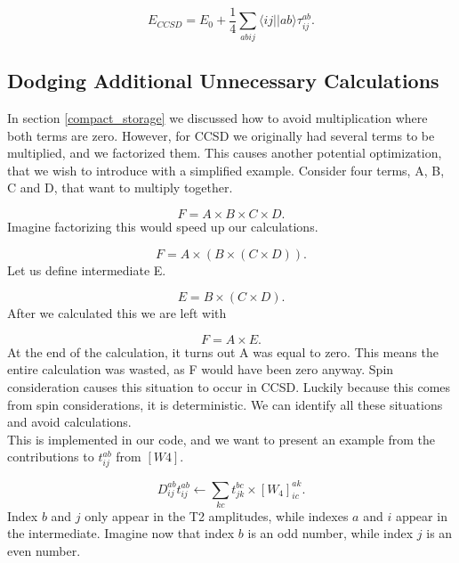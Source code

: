 \documentclass[a4paper,norsk,11pt,twoside]{report}
\begin{document}
\begin{equation}
E_{CCSD} = E_0 + \frac{1}{4} \sum_{abij} \langle ij || ab \rangle \tau_{ij}^{ab} .
\end{equation}

\subsection{Dodging Additional Unnecessary Calculations}
In section \ref{compact_storage} we discussed how to avoid multiplication where both terms are zero. However, for CCSD we originally had several terms to be multiplied, and we factorized them. This causes another potential optimization, that we wish to introduce with a simplified example. Consider four terms, A, B, C and D, that want to multiply together.

\begin{equation}
F = A \times B \times C \times D .
\end{equation}
Imagine factorizing this would speed up our calculations.

\begin{equation}
F = A \times (B \times (C \times D ) ) .
\end{equation}
Let us define intermediate E.

\begin{equation}
E = B \times (C \times D ) .
\end{equation}
After we calculated this we are left with

\begin{equation}
F = A \times E .
\end{equation}
At the end of the calculation, it turns out A was equal to zero. This means the entire calculation was wasted, as F would have been zero anyway. Spin consideration causes this situation to occur in CCSD. Luckily because this comes from spin considerations, it is deterministic. We can identify all these situations and avoid calculations. \\

This is implemented in our code, and we want to present an example from the contributions to $t_{ij}^{ab}$ from $[W4]$.

\begin{equation}
D_{ij}^{ab} t_{ij}^{ab} \leftarrow \sum_{kc} t_{jk}^{bc} \times [W_4]_{ic}^{ak} .
\end{equation}
Index $b$ and $j$ only appear in the T2 amplitudes, while indexes $a$ and $i$ appear in the intermediate. Imagine now that index $b$ is an odd number, while index $j$ is an even number. \\
\end{document}
